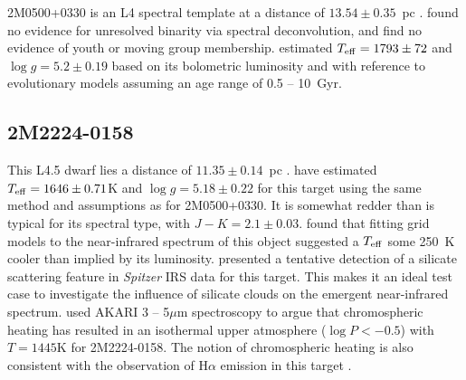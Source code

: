 \documentclass[useAMS,usenatbib]{mn2e}
\begin{document}
2M0500+0330 is an L4 spectral template \citep{reid2008} at a distance of $13.54 \pm 0.35$~pc \citep{faherty2009}.  \citet{gagliuffi2014} found no evidence for unresolved binarity via spectral deconvolution, and \citet{gagne2015} find no evidence of youth or moving group membership.  \citet{filippazzo2015} estimated $T_{\rm eff} = 1793 \pm 72$ and $\log g = 5.2 \pm 0.19$  based on its bolometric luminosity and with reference to evolutionary models assuming an age range of 0.5 -- 10~Gyr.


\subsection{2M2224-0158}

This L4.5 dwarf lies a distance of $11.35 \pm 0.14$~pc \citep{faherty2012}. \citet{filippazzo2015} have estimated $T_{\rm eff} = 1646 \pm 0.71$K and $\log g = 5.18 \pm 0.22$ for this target using the same method and assumptions as for 2M0500+0330. It is somewhat redder than is typical for its spectral type, with $J-K = 2.1 \pm 0.03$. \citet{stephens2009} found that fitting grid models to the near-infrared spectrum of this object suggested a $T_{\rm eff}$ some 250~K cooler than implied by its luminosity.  \citet{cushing2006} presented a tentative detection of a silicate scattering feature in {\it Spitzer} IRS data for this target. This makes it an ideal test case to investigate the influence of silicate clouds on the emergent near-infrared spectrum. \citet{sorahana2014} used AKARI 3 -- 5$\mu$m spectroscopy to argue that chromospheric heating has resulted in an isothermal upper atmosphere ($\log P < -0.5$) with $T = 1445$K for 2M2224-0158. The notion of chromospheric heating is also consistent with the observation of H$\alpha$ emission in this target \citep{kirkpatrick2000}.
\end{document}
